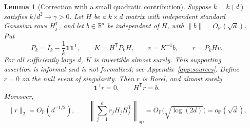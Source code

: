 \documentclass[11pt]{article}
\newcommand{\R}{\mathbb R}
\newcommand{\Pbb}{\mathbb P}
\newcommand{\norm}[1]{\lVert#1\rVert}
\newcommand{\OP}{O_{\Pbb}}
\newtheorem{lemma}[theorem]{Lemma}
\theoremstyle{remark}
\begin{document}
\begin{lemma}[Correction with a small quadratic contribution]
\label{lem:reserve-correction}
Suppose $k=k(d)$ satisfies $k/d^2\to\gamma>0$. Let $H$ be a $k\times d$
matrix with independent standard Gaussian rows $H_j^{\mathsf T}$, and
let $b\in\R^d$ be independent of $H$, with $\norm b=\OP(\sqrt d)$.
Put
\[
 P_k=I_k-\frac1k\mathbf1\mathbf1^{\mathsf T},\qquad
 K=H^{\mathsf T}P_kH,\qquad v=K^{-1}b,\qquad r=P_kHv.
\]
For all sufficiently large $d$, $K$ is invertible almost surely. This
supporting assertion is informal and is not formalized; see
Appendix~\ref{app:sources}. Define $r=0$ on the null event of
singularity. Then $r$ is Borel, and almost surely
\begin{equation}\label{eq:reserve-identities}
 \mathbf1^{\mathsf T}r=0,\qquad H^{\mathsf T}r=b.
\end{equation}
Moreover,
\begin{equation}\label{eq:reserve-bounds}
 \norm r_2=\OP(d^{-1/2}),\qquad
 \left\|\sum_{j=1}^k r_jH_jH_j^{\mathsf T}\right\|_{\mathrm{op}}
       =\OP\big(\sqrt{\log(2d)}\big)=o_{\Pbb}(\sqrt d).
\end{equation}
\end{lemma}
\end{document}
